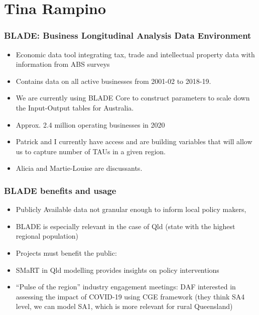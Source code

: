 \documentclass[handout,english]{beamer}
\begin{document}
\section{Tina Rampino}
\begin{frame}\thispagestyle{empty}\small
  \frametitle{BLADE: \small 	Business Longitudinal Analysis Data Environment} 
  \begin{itemize}
    \item Economic data tool integrating tax, trade and intellectual property data 
  with information from ABS surveys
    
   \item Contains data on all active businesses from 2001-02 to 2018-19.
	
   \item We are currently using BLADE Core to construct parameters to scale down
  the Input-Output tables for Australia.

   \item Approx. 2.4 million operating businesses in 2020
  
   \item Patrick and I currently have access and are building 
  variables that will allow us to capture number of TAUs in a given region.

   \item Alicia and Martie-Louise are discussants.
\end{itemize}
\end{frame}
\begin{frame}\thispagestyle{empty}\small
  \frametitle{BLADE benefits and usage}
\begin{itemize}
	  \item Publicly Available data not granular enough to inform local policy makers, 
	  \item BLADE is especially relevant in the case of Qld (state with the highest regional population)
	  \item Projects must benefit the public:
	  \item SMaRT in Qld modelling provides insights on policy interventions
	  \item “Pulse of the region” industry engagement meetings: DAF interested in assessing the impact of COVID-19 using CGE framework (they think SA4 level, we can model SA1, which is more relevant for rural Queensland)
  \end{itemize}
\end{frame}
\end{document}
